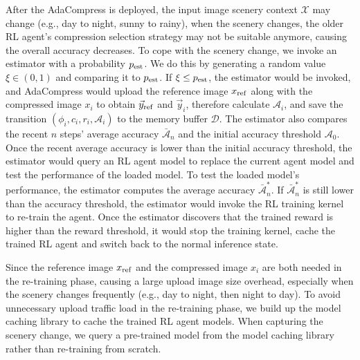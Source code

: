 After the AdaCompress is deployed, the input image scenery context $ \mathcal{X} $ may change (e.g., day to night, sunny to rainy), when the scenery changes, the older RL agent's compression selection strategy may not be suitable anymore, causing the overall accuracy decreases. To cope with the scenery change, we invoke an estimator with a probability $ p_{\rm est} $. We do this by generating a random value $ \xi \in (0,1) $ and comparing it to $ p_{\rm est} $. If $ \xi \leq p_{\rm est} $, the estimator would be invoked, and AdaCompress would upload the reference image $ x_{\rm ref} $ along with the compressed image $ x_i $ to obtain $ \vec{y}_{\rm ref} $ and $ \vec{y}_i $, therefore calculate $ \mathcal{A}_i $, and save the transition $ (\phi_i, c_i, r_i, \mathcal{A}_i) $ to the memory buffer $ \mathcal{D} $. The estimator also compares the recent $ n $ steps' average accuracy $ \bar{\mathcal{A}}_n $ and the initial accuracy threshold $ \mathcal{A}_0 $. Once the recent average accuracy is lower than the initial accuracy threshold, the estimator would query an RL agent model to replace the current agent model and test the performance of the loaded model. To test the loaded model's performance, the estimator computes the average accuracy $ \bar{\mathcal{A}}^*_n $. If $ \bar{\mathcal{A}}^*_n $ is still lower than the accuracy threshold, the estimator would invoke the RL training kernel to re-train the agent. Once the estimator discovers that the trained reward is higher than the reward threshold, it would stop the training kernel, cache the trained RL agent and switch back to the normal inference state. 

Since the reference image $ x_{\rm ref} $ and the compressed image $ x_i $ are both needed in the re-training phase, causing a large upload image size overhead, especially when the scenery changes frequently (e.g., day to night, then night to day). To avoid unnecessary upload traffic load in the re-training phase, we build up the model caching library to cache the trained RL agent models. When capturing the scenery change, we query a pre-trained model from the model caching library rather than re-training from scratch. %

